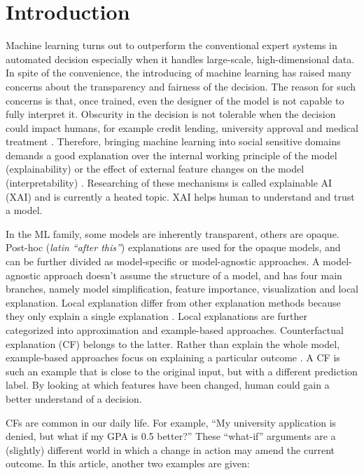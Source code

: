 \section{Introduction}
Machine learning turns out to outperform the conventional expert systems in automated decision especially when it handles large-scale, high-dimensional data. In spite of the convenience, the introducing of machine learning has raised many concerns about the transparency and fairness of the decision. The reason for such concerns is that, once trained, even the designer of the model is not capable to fully interpret it. Obscurity in the decision is not tolerable when the decision could impact humans, for example credit lending, university approval and medical treatment \cite{CFReview}. Therefore, bringing machine learning into social sensitive domains demands a good explanation over the internal working principle of the model (explainability) or the effect of external feature changes on the model (interpretability) \cite{XAIBook}.
Researching of these mechanisms is called explainable AI (XAI) and is currently a heated topic. XAI helps human to understand and trust a model.

In the ML family, some models are inherently transparent, others are opaque. Post-hoc (\emph{latin ``after this''}) explanations are used for the opaque models, and can be further divided as model-specific or model-agnostic approaches. A model-agnostic approach doesn't assume the structure of a model, and has four main branches, namely model simplification, feature importance, visualization and local explanation. Local explanation differ from other explanation methods because they only explain a single explanation \cite{CFReview}. Local explanations are further categorized into approximation and example-based approaches. Counterfactual explanation (CF) belongs to the latter. Rather than explain the whole model, example-based approaches focus on explaining a particular outcome \cite{CFReview}. A CF is such an example that is close to the original input, but with a different prediction label. By looking at which features have been changed, human could gain a better understand of a decision.
  
CFs are common in our daily life. For example, ``My university application is denied, but what if my GPA is 0.5 better?'' These ``what-if'' arguments are a (slightly) different world in which a change in action may amend the current outcome. In this article, another two examples are given:

